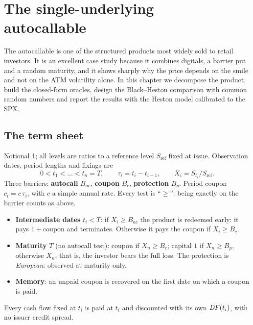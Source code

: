 \chapter[The single-underlying autocallable]{The single-underlying\\ autocallable}
\label{cap:autocallable}

The autocallable is one of the structured products most widely sold to retail investors. It is an excellent case
study because it combines digitals, a barrier put and a random maturity, and it shows sharply why the price depends on
the smile and not on the ATM volatility alone. In this chapter we decompose the product, build the closed-form oracles,
design the Black--Heston comparison with common random numbers and report the results with the Heston model calibrated
to the SPX.

\section{The term sheet}
Notional 1; all levels are ratios to a reference level $S_{\text{ref}}$ fixed at issue. Observation dates, period
lengths and fixings are
\[
0<t_1<\dots<t_n=T,\qquad\tau_i=t_i-t_{i-1},\qquad X_i=S_{t_i}/S_{\text{ref}} .
\]
Three barriers: \textbf{autocall} $B_{ac}$, \textbf{coupon} $B_c$, \textbf{protection} $B_p$. Period coupon
$c_i=c\,\tau_i$, with $c$ a simple annual rate. Every test is ``$\ge$'': being exactly on the barrier counts as above.
\begin{itemize}
\item \textbf{Intermediate dates} $t_i<T$: if $X_i\ge B_{ac}$ the product is redeemed early: it pays $1+$coupon and
terminates. Otherwise it pays the coupon if $X_i\ge B_c$.
\item \textbf{Maturity} $T$ (no autocall test): coupon if $X_n\ge B_c$; capital $1$ if $X_n\ge B_p$, otherwise $X_n$,
that is, the investor bears the full loss. The protection is \emph{European}: observed at maturity only.
\item \textbf{Memory}: an unpaid coupon is recovered on the first date on which a coupon is paid.
\end{itemize}
Every cash flow fixed at $t_i$ is paid at $t_i$ and discounted with its own $\mathit{DF}(t_i)$, with no issuer credit spread.

